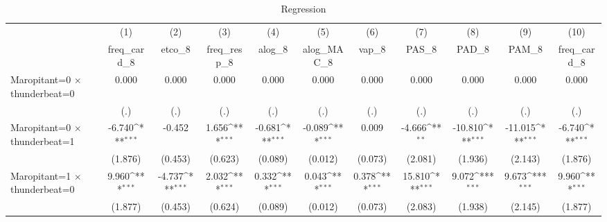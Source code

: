 \begin{table}[htbp]\centering
\def\sym#1{\ifmmode^{#1}\else\(^{#1}\)\fi}
\caption{Regression}
\begin{tabular}{l*{10}{c}}
\toprule
                    &\multicolumn{1}{c}{(1)}&\multicolumn{1}{c}{(2)}&\multicolumn{1}{c}{(3)}&\multicolumn{1}{c}{(4)}&\multicolumn{1}{c}{(5)}&\multicolumn{1}{c}{(6)}&\multicolumn{1}{c}{(7)}&\multicolumn{1}{c}{(8)}&\multicolumn{1}{c}{(9)}&\multicolumn{1}{c}{(10)}\\
                    &\multicolumn{1}{c}{freq\_card\_8}&\multicolumn{1}{c}{etco\_8}&\multicolumn{1}{c}{freq\_resp\_8}&\multicolumn{1}{c}{alog\_8}&\multicolumn{1}{c}{alog\_MAC\_8}&\multicolumn{1}{c}{vap\_8}&\multicolumn{1}{c}{PAS\_8}&\multicolumn{1}{c}{PAD\_8}&\multicolumn{1}{c}{PAM\_8}&\multicolumn{1}{c}{freq\_card\_8}\\
\midrule
Maropitant=0 $\times$ thunderbeat=0&       0.000         &       0.000         &       0.000         &       0.000         &       0.000         &       0.000         &       0.000         &       0.000         &       0.000         &       0.000         \\
                    &         (.)         &         (.)         &         (.)         &         (.)         &         (.)         &         (.)         &         (.)         &         (.)         &         (.)         &         (.)         \\
\addlinespace
Maropitant=0 $\times$ thunderbeat=1&      -6.740\sym{***}&      -0.452         &       1.656\sym{***}&      -0.681\sym{***}&      -0.089\sym{***}&       0.009         &      -4.666\sym{**} &     -10.810\sym{***}&     -11.015\sym{***}&      -6.740\sym{***}\\
                    &     (1.876)         &     (0.453)         &     (0.623)         &     (0.089)         &     (0.012)         &     (0.073)         &     (2.081)         &     (1.936)         &     (2.143)         &     (1.876)         \\
\addlinespace
Maropitant=1 $\times$ thunderbeat=0&       9.960\sym{***}&      -4.737\sym{***}&       2.032\sym{***}&       0.332\sym{***}&       0.043\sym{***}&       0.378\sym{***}&      15.810\sym{***}&       9.072\sym{***}&       9.673\sym{***}&       9.960\sym{***}\\
                    &     (1.877)         &     (0.453)         &     (0.624)         &     (0.089)         &     (0.012)         &     (0.073)         &     (2.083)         &     (1.938)         &     (2.145)         &     (1.877)         \\

\end{tabular}
\end{table}
